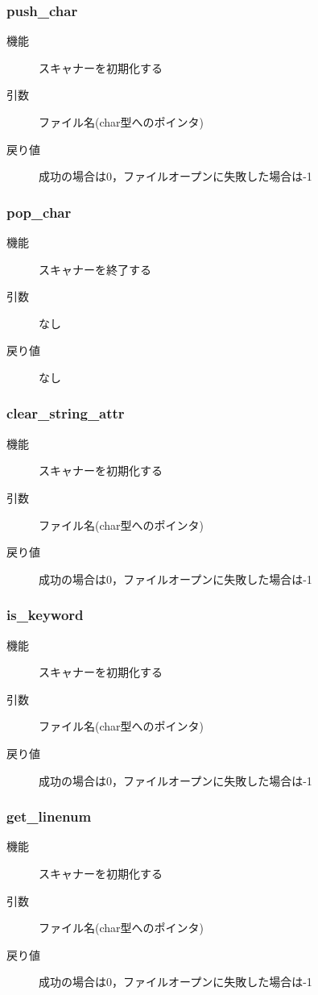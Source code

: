 \documentclass{jlreq}
\begin{document}
\subsubsection{push\_char}
\begin{description}
  \item[機能] スキャナーを初期化する
  \item[引数] ファイル名(char型へのポインタ)
  \item[戻り値] 成功の場合は0，ファイルオープンに失敗した場合は-1
\end{description}

\subsubsection{pop\_char}
\begin{description}
  \item[機能] スキャナーを終了する
  \item[引数] なし
  \item[戻り値] なし
\end{description}

\subsubsection{clear\_string\_attr}
\begin{description}
  \item[機能] スキャナーを初期化する
  \item[引数] ファイル名(char型へのポインタ)
  \item[戻り値] 成功の場合は0，ファイルオープンに失敗した場合は-1
\end{description}

\subsubsection{is\_keyword}
\begin{description}
  \item[機能] スキャナーを初期化する
  \item[引数] ファイル名(char型へのポインタ)
  \item[戻り値] 成功の場合は0，ファイルオープンに失敗した場合は-1
\end{description}

\subsubsection{get\_linenum}
\begin{description}
  \item[機能] スキャナーを初期化する
  \item[引数] ファイル名(char型へのポインタ)
  \item[戻り値] 成功の場合は0，ファイルオープンに失敗した場合は-1
\end{description}
\end{document}
